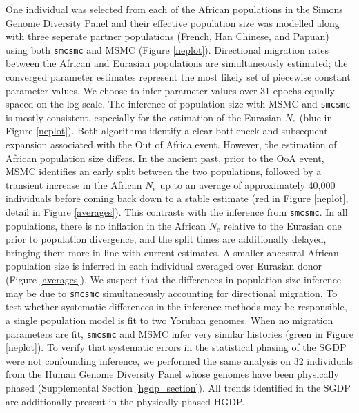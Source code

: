 \documentclass{article}
\begin{document}
One individual was selected from each of the African populations in the Simons Genome Diversity Panel and their effective population size was modelled along with three seperate partner populations (French, Han Chinese, and Papuan) using both {\tt smcsmc} and MSMC (Figure \ref{neplot}). Directional migration rates between the African and Eurasian populations are simultaneously estimated; the converged parameter estimates represent the most likely set of piecewise constant parameter values. We choose to infer parameter values over 31 epochs equally spaced on the log scale. The inference of population size with MSMC and {\tt smcsmc} is mostly consistent, especially for the estimation of the Eurasian $N_e$ (blue in Figure \ref{neplot}). Both algorithms identify a clear bottleneck and subsequent expansion associated with the Out of Africa event. However, the estimation of African population size differs. In the ancient past, prior to the OoA event, MSMC identifies an early split between the two populations, followed by a transient increase in the African $N_e$ up to an average of approximately 40,000 individuals before coming back down to a stable estimate (red in Figure \ref{neplot}, detail in Figure \ref{averages}). This contrasts with the inference from {\tt smcsmc}. In all populations, there is no inflation in the African $N_e$ relative to the Eurasian one prior to population divergence, and the split times are additionally delayed, bringing them more in line with current estimates. A smaller ancestral African population size is inferred in each individual averaged over Eurasian donor (Figure \ref{averages}). We suspect that the differences in population size inference may be due to {\tt smcsmc} simultaneously accounting for directional migration. To test whether systematic differences in the inference methods may be responsible, a single population model is fit to two Yoruban genomes. When no migration parameters are fit, {\tt smcsmc} and MSMC infer very similar histories (green in Figure \ref{neplot}). To verify that systematic errors in the statistical phasing of the SGDP were not confounding inference, we performed the same analysis on 32 individuals from the Human Genome Diversity Panel whose genomes have been physically phased (Supplemental Section \ref{hgdp_section}). All trends identified in the SGDP are additionally present in the physically phased HGDP.   

\end{document}

